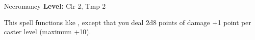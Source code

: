 {Necromancy}
{
	\textbf{Level:}
	Clr 2, Tmp 2\\
}
{
	This spell functions like , except that you deal 2d8 points of damage +1 point per caster level (maximum +10).

}
